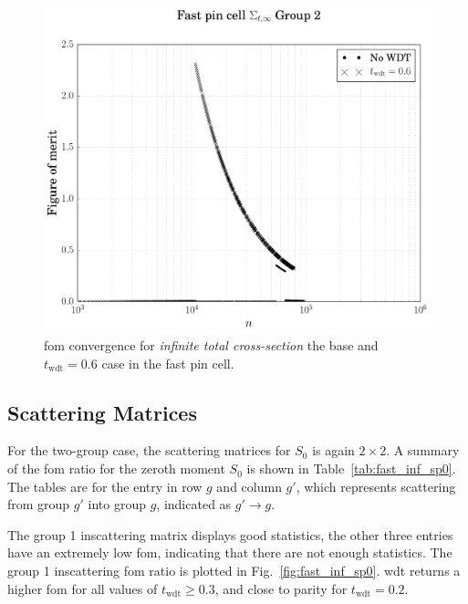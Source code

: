 \begin{figure}[hbtp]
  \centering
  \includegraphics[scale=0.5]{images/results/fast_inf_tot_example}
  \caption[\Acrshort{fom} convergence for  \textit{infinite total cross-section} the base
  and $t_{\mathrm{wdt}} = 0.6$ case in the fast pin cell.]{\Acrshort{fom} convergence for
     \textit{infinite total cross-section} the base and $t_{\mathrm{wdt}} = 0.6$ case in the fast pin cell.}
  \label{fig:fast_inf_tot_example}
\end{figure}

\subsection{Scattering Matrices}
\label{sec:fast_inf_sp0}

For the two-group case, the scattering matrices for $S_0$ is again $2 \times 2$. A summary of the \gls{fom} ratio
for the zeroth moment $S_0$ is shown in Table~\ref{tab:fast_inf_sp0}. The
tables are for the entry in row $g$ and column $g'$, which represents
scattering from group $g'$ into group $g$, indicated as $g' \to g$.

The group 1 inscattering matrix displays good statistics, the other
three entries have an extremely low \gls{fom}, indicating that there
are not enough statistics. The group 1 inscattering \gls{fom} ratio is
plotted in Fig.~\ref{fig:fast_inf_sp0}. \gls{wdt} returns a higher
\gls{fom} for all values of $t_{\mathrm{wdt}} \geq 0.3$, and close to
parity for $t_{\mathrm{wdt}} = 0.2$.

